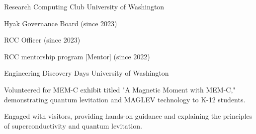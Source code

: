 


\begin{cventries}

\cventry
  {}
  {Research Computing Club} %
  {University of Washington} %
  {}
  {
    \begin{cvitems}
    \item{Hyak Governance Board (since 2023)}
    \item{RCC Officer (since 2023)}
    \item{RCC mentorship program [Mentor] (since 2022)}
    \end{cvitems}
  }

\cventry
  {}
  {Engineering Discovery Days} %
  {University of Washington} %
  {}
  {
    \begin{cvitems}
    \item{Volunteered for MEM-C exhibit titled "A Magnetic Moment with MEM-C," demonstrating quantum levitation and MAGLEV technology to K-12 students.}
    \item{Engaged with visitors, providing hands-on guidance and explaining the principles of superconductivity and quantum levitation.}
    \end{cvitems}
  }

\end{cventries}
